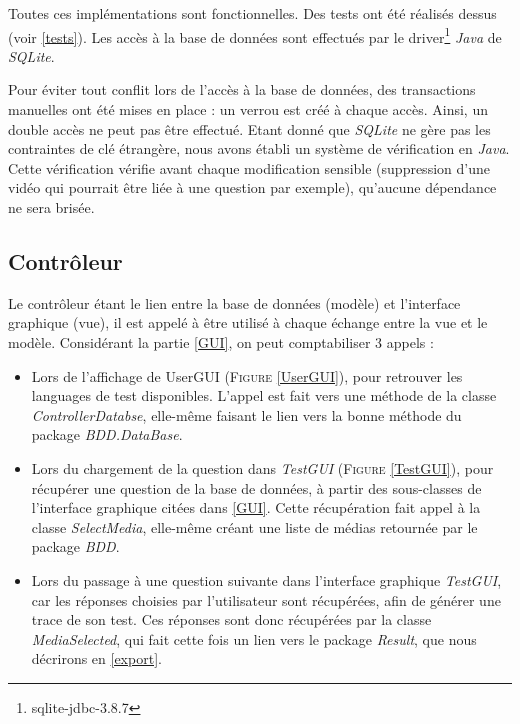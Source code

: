 Toutes ces implémentations sont fonctionnelles. Des tests ont été réalisés dessus (voir \ref{tests}).
Les accès à la base de données sont effectués par le driver\footnote{sqlite-jdbc-3.8.7} \textit{Java} de \textit{SQLite}.

Pour éviter tout conflit lors de l'accès à la base de données, des transactions manuelles ont été mises en place : un verrou est créé à chaque accès. Ainsi, un double accès ne peut pas être effectué.
Etant donné que \textit{SQLite} ne gère pas les contraintes de clé étrangère, nous avons établi un système de vérification en \textit{Java}. Cette vérification vérifie avant chaque modification sensible (suppression d'une vidéo qui pourrait être liée à une question par exemple), qu'aucune dépendance ne sera brisée.


\subsection{Contrôleur}\label{controller}


Le contrôleur étant le lien entre la base de données (modèle) et l'interface graphique (vue), il est appelé à être utilisé à chaque échange entre la vue et le modèle.
Considérant la partie \ref{GUI}, on peut comptabiliser 3 appels :

\begin{itemize}
 \item Lors de l'affichage de UserGUI (\textsc{Figure} \ref{UserGUI}), pour retrouver les languages de test disponibles. L'appel est fait vers une méthode de la classe \textit{ControllerDatabse}, elle-même faisant le lien vers la bonne méthode du package \textit{BDD.DataBase}.
 \item Lors du chargement de la question dans \textit{TestGUI} (\textsc{Figure} \ref{TestGUI}), pour récupérer une question de la base de données, à partir des sous-classes de l'interface graphique citées dans \ref{GUI}. Cette récupération fait appel à la classe \textit{SelectMedia}, elle-même créant une liste de médias retournée par le package \textit{BDD}.
 \item Lors du passage à une question suivante dans l'interface graphique \textit{TestGUI}, car les réponses choisies par l'utilisateur sont récupérées, afin de générer une trace de son test. Ces réponses sont donc récupérées par la classe \textit{MediaSelected}, qui fait cette fois un lien vers le package \textit{Result}, que nous décrirons en \ref{export}.
\end{itemize}


